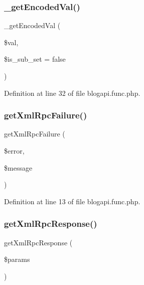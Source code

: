 \subsubsection{\texorpdfstring{\+\_\+get\+Encoded\+Val()}{\_getEncodedVal()}}
{\footnotesize\ttfamily \+\_\+get\+Encoded\+Val (\begin{DoxyParamCaption}\item[{}]{\$val,  }\item[{}]{\$is\+\_\+sub\+\_\+set = {\ttfamily false} }\end{DoxyParamCaption})}



Definition at line 32 of file blogapi.\+func.\+php.

\mbox{\label{blogapi_8func_8php_a7e46f8d2f9b3c3115d176926b68b6b09}} 
\subsubsection{\texorpdfstring{get\+Xml\+Rpc\+Failure()}{getXmlRpcFailure()}}
{\footnotesize\ttfamily get\+Xml\+Rpc\+Failure (\begin{DoxyParamCaption}\item[{}]{\$error,  }\item[{}]{\$message }\end{DoxyParamCaption})}



Definition at line 13 of file blogapi.\+func.\+php.

\mbox{\label{blogapi_8func_8php_a18b93e72ecaae5fdfcfe1f0f107238f6}} 
\subsubsection{\texorpdfstring{get\+Xml\+Rpc\+Response()}{getXmlRpcResponse()}}
{\footnotesize\ttfamily get\+Xml\+Rpc\+Response (\begin{DoxyParamCaption}\item[{}]{\$params }\end{DoxyParamCaption})}



